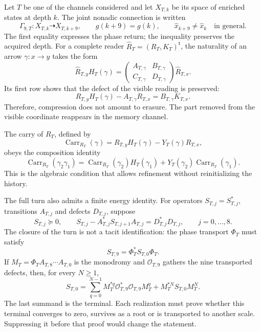Let \(T\) be one of the channels considered and let
\(X_{T,k}\) be its space of enriched states at depth \(k\). The
joint nonadic connection is written
\begin{equation}\label{eq:realizaciones-gamma9}
 \Gamma_{9,T}:X_{T,k}\dashrightarrow X_{T,k+9},
 \qquad g(k+9)=g(k),
 \qquad \widehat x_{k+9}\neq\widehat x_k
 \quad\text{in general}.
\end{equation}
The first equality expresses the phase return; the inequality preserves the
acquired depth. For a complete reader
\(\widehat R_T=(R_T,K_T)^{\mathsf t}\), the naturality of an arrow
\(\gamma:x\to y\) takes the form
\begin{equation}\label{eq:realizaciones-lrdn}
 \widehat R_{T,y}H_T(\gamma)=
 \begin{pmatrix}
  A_{T,\gamma}&B_{T,\gamma}\\
  C_{T,\gamma}&D_{T,\gamma}
 \end{pmatrix}
 \widehat R_{T,x}.
\end{equation}
Its first row shows that the defect of the visible reading is preserved:
\begin{equation}\label{eq:realizaciones-defecto-visible}
 R_{T,y}H_T(\gamma)-A_{T,\gamma}R_{T,x}
 =B_{T,\gamma}K_{T,x}.
\end{equation}
Therefore, compression does not amount to erasure. The part removed from the
visible coordinate reappears in the memory channel.

The carry of \(R_T\), defined by
\[
 \operatorname{Carr}_{R_T}(\gamma)
 =R_{T,y}H_T(\gamma)-Y_T(\gamma)R_{T,x},
\]
obeys the composition identity
\begin{equation}\label{eq:realizaciones-cociclo-acarreo}
 \operatorname{Carr}_{R_T}(\gamma_2\gamma_1)
 =\operatorname{Carr}_{R_T}(\gamma_2)H_T(\gamma_1)
 +Y_T(\gamma_2)\operatorname{Carr}_{R_T}(\gamma_1).
\end{equation}
This is the algebraic condition that allows refinement without reinitializing the
history.

The full turn also admits a finite energy identity. For
operators \(S_{T,j}=S_{T,j}^*\), transitions \(A_{T,j}\) and defects
\(D_{T,j}\), suppose
\[
 S_{T,j}\succeq0,
 \qquad
 S_{T,j}-A_{T,j}^*S_{T,j+1}A_{T,j}=D_{T,j}^*D_{T,j},
 \qquad j=0,\ldots,8.
\]
The closure of the turn is not a tacit identification: the phase
transport \(\Phi_T\) must satisfy
\begin{equation}\label{eq:realizaciones-cierre-forma}
 S_{T,9}=\Phi_T^*S_{T,0}\Phi_T.
\end{equation}
If \(M_T=\Phi_TA_{T,8}\cdots A_{T,0}\) is the monodromy and
\(\mathcal O_{T,9}\) gathers the nine transported defects, then, for
every \(N\geq1\),
\begin{equation}\label{eq:realizaciones-telescopia-terminal}
 S_{T,0}
 =\sum_{q=0}^{N-1}
 M_T^{*q}\mathcal O_{T,9}^*\mathcal O_{T,9}M_T^q
 +M_T^{*N}S_{T,0}M_T^N.
\end{equation}
The last summand is the terminal. Each realization must prove whether this
terminal converges to zero, survives as a root or is transported to another
scale. Suppressing it before that proof would change the statement.

